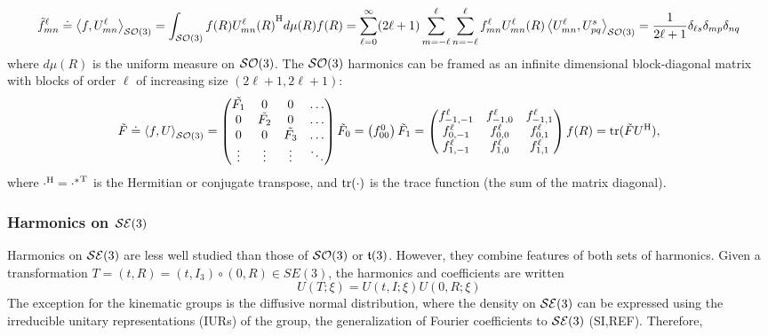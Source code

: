\documentclass[../main.tex]{subfiles}
\begin{document}
\begin{refsection}
\[
\tilde{f}^\ell_{mn} \doteq \left\langle f, U^\ell_{mn} \right\rangle_{\mathcal{SO}(3)} =
  \int_{\mathcal{SO}(3)} f(R) {U^\ell_{mn}(R)}^\mathrm{H} d\mu(R)\\
f(R) = \sum_{\ell=0}^\infty (2\ell+1) \sum_{m=-\ell}^{\ell} \sum_{n=-\ell}^{\ell} f^\ell_{mn} U^\ell_{mn}(R)\\
\left\langle  U^\ell_{mn} ,  U^s_{pq}  \right\rangle_{\mathcal{SO}(3)} = \frac{1}{2\ell+1} \delta_{\ell s} \delta_{mp} \delta_{nq}
\]
where $d\mu(R)$ is the uniform measure on $\mathcal{SO}(3)$.
The $\mathcal{SO}(3)$ harmonics can be framed as an infinite dimensional block-diagonal matrix with blocks of order $\ell$ of increasing size $(2\ell+1, 2\ell+1)$:
\[
\tilde{F} \doteq \left\langle f, U \right\rangle_{\mathcal{SO}(3)} =
\begin{pmatrix}
  \tilde{F_1} &            0 &             0 &  \dots \\
           0 &   \tilde{F_2} &             0 &  \dots \\
           0 &            0 &    \tilde{F_3} &  \dots \\
      \vdots &       \vdots &        \vdots & \ddots \\
\end{pmatrix}\\
\tilde{F}_0 = \begin{pmatrix}f^0_{00}\end{pmatrix}\\
\tilde{F}_1 = \begin{pmatrix}
f^\ell_{-1,-1} & f^\ell_{-1,0} & f^\ell_{-1,1}\\
 f^\ell_{0,-1} &  f^\ell_{0,0} &  f^\ell_{0,1}\\
 f^\ell_{1,-1} &  f^\ell_{1,0} &  f^\ell_{1,1}
\end{pmatrix}\\
f(R) = \operatorname{tr}(\tilde{F} {U}^\mathrm{H}),
\]
where ${\cdot}^\mathrm{H} = {{\cdot}^*}^\mathrm{T}$ is the Hermitian or conjugate transpose, and $\operatorname{tr}(\cdot)$ is the trace function (the sum of the matrix diagonal).

\subsubsection{\texorpdfstring{Harmonics on $\mathcal{SE}(3)$}{Harmonics on \textbackslash SE\{3\}}}\label{harmonics-on-se3}

Harmonics on $\mathcal{SE}(3)$ are less well studied than those of $\mathcal{SO}(3)$ or $\mathfrak{t}(3)$.
However, they combine features of both sets of harmonics.
Given a transformation $T = (t,R) = (t, I_3) \circ (0, R) \in SE(3)$, the harmonics and coefficients are written
\[
U(T; \xi) = U(t, I; \xi) U(0, R; \xi)
\]
The exception for the kinematic groups is the diffusive normal distribution, where the density on $\mathcal{SE}(3)$ can be expressed using the irreducible unitary representations (IURs) of the group, the generalization of Fourier coefficients to $\mathcal{SE}(3)$ (SI,REF).
Therefore,


\end{refsection}
\end{document}
